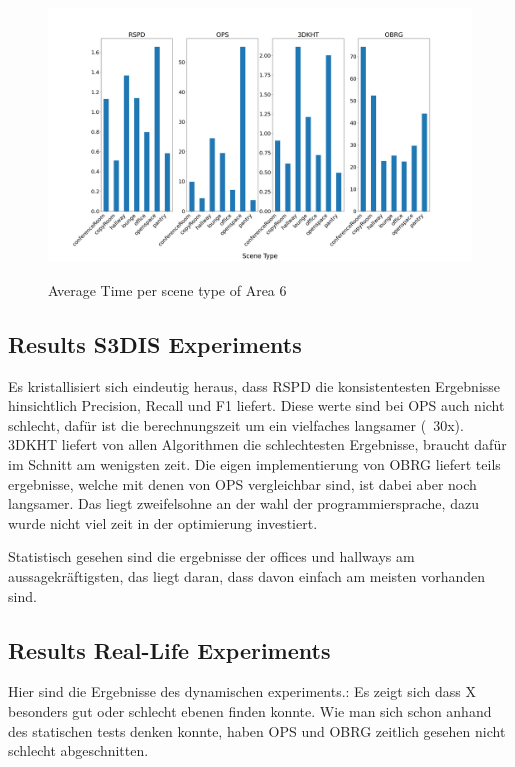 \documentclass[main.tex]{subfiles}
\begin{document}
\begin{figure}[H]
    \centering
    \includegraphics[width=15 cm]{images/area_6_time.png}
    \label{fig:area6T}
    \caption[Times Area 6]{Average Time per scene type of Area 6}
\end{figure}

\subsection*{Results S3DIS Experiments}
Es kristallisiert sich eindeutig heraus, dass RSPD die konsistentesten Ergebnisse hinsichtlich
Precision, Recall und F1 liefert. Diese werte sind bei OPS auch nicht schlecht, dafür ist die
berechnungszeit um ein vielfaches langsamer (~30x). 3DKHT liefert von allen Algorithmen die schlechtesten
Ergebnisse, braucht dafür im Schnitt am wenigsten zeit. Die eigen implementierung von OBRG liefert teils ergebnisse,
welche mit denen von OPS vergleichbar sind, ist dabei aber noch langsamer. Das liegt zweifelsohne an der wahl der
programmiersprache, dazu wurde nicht viel zeit in der optimierung investiert.

Statistisch gesehen sind die ergebnisse der offices und hallways am aussagekräftigsten, das liegt daran, dass davon einfach am meisten vorhanden sind.



\subsection{Results Real-Life Experiments}

Hier sind die Ergebnisse des dynamischen experiments.:
Es zeigt sich dass X besonders gut oder schlecht ebenen finden konnte. Wie man sich schon anhand des statischen tests denken konnte, haben OPS und OBRG zeitlich
gesehen nicht schlecht abgeschnitten.
\end{document}
